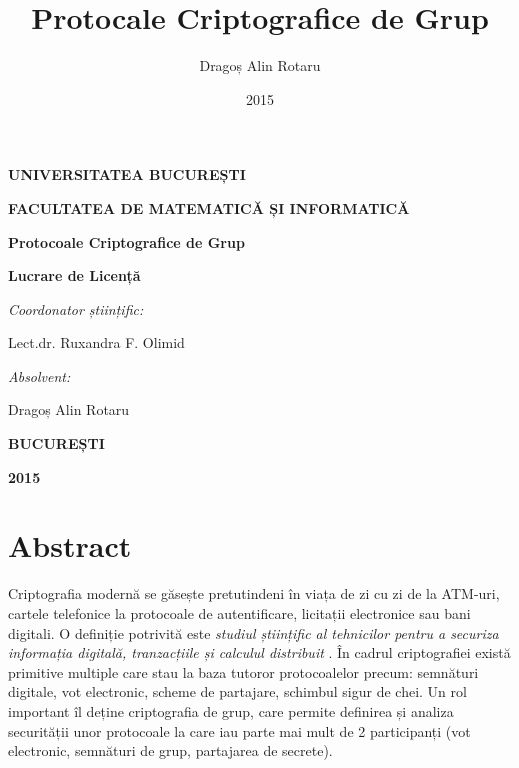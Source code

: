 \documentclass[oneside, 12pt]{book}
\title{Protocale Criptografice de Grup}
\author{Dragoș Alin Rotaru}
\date{2015}
\begin{document}
\thispagestyle{empty}

\nocite*{}

\begin{center}
\centerline{\bf UNIVERSITATEA BUCUREȘTI}
\centerline{\bf FACULTATEA DE MATEMATICĂ ȘI INFORMATICĂ}

\end{center}
\vspace{4.5cm}

\centerline{\huge \bf Protocoale Criptografice de Grup}

\vspace{0.5cm}

\centerline{\large \bf Lucrare de Licență}

\vspace{3.5cm}

\begin{flushleft}
{\Large \textit{Coordonator științific:}\vspace{0.2cm}}

{\Large Lect.dr. Ruxandra F. Olimid}
\end{flushleft}

\vspace{1cm}
\begin{flushright}
{\Large \textit{Absolvent:}\vspace{0.2cm}}

{\Large Dragoș Alin Rotaru}
\end{flushright}


\vspace{2cm}

\centerline{\bf BUCUREȘTI}

\centerline{\bf 2015}

\chapter*{Abstract}

\hspace*{5mm} Criptografia modernă se găsește pretutindeni în viața de zi cu zi de la ATM-uri, cartele telefonice la protocoale de autentificare, licitații electronice sau bani digitali. O definiție potrivită este \textit{studiul științific al tehnicilor pentru a securiza informația digitală, tranzacțiile și calculul distribuit} \cite{Katz:2007}. În cadrul criptografiei există primitive multiple care stau la baza tutoror protocoalelor precum: semnături digitale, vot electronic, scheme de partajare, schimbul sigur de chei. Un rol important îl deține criptografia de grup, care permite definirea și analiza securității unor protocoale la care iau parte mai mult de 2 participanți (vot electronic, semnături de grup, partajarea de secrete).
\end{document}
